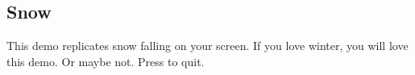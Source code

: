 \subsection{Snow}
This demo replicates snow falling on your screen. If you love winter,
you will love this demo.  Or maybe not.
Press
to quit.

